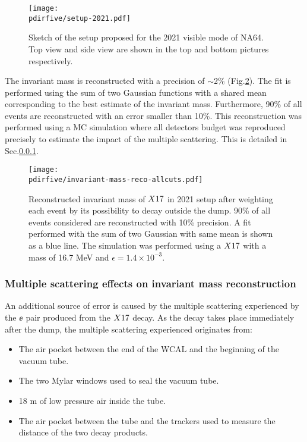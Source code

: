 \begin{figure}[tbh!]
  \centering
  \texttt{[image: \\pdirfive/setup-2021.pdf]}
  \caption[2021 setup]{Sketch of the setup proposed for the 2021 visible mode of NA64. Top view and side view are shown in the top and bottom pictures respectively.}
  \label{fig:setup-2021}
\end{figure}

The invariant mass is reconstructed with a precision of $\sim$2\% (Fig.\ref{fig:imassreco}). The fit is performed using the sum of two Gaussian functions with a shared mean corresponding to the best estimate of the invariant mass. Furthermore, 90\% of all events are reconstructed with an error smaller than 10\%. This reconstruction was performed using a MC simulation where all detectors budget was reproduced precisely to estimate the impact of the multiple scattering. This is detailed in Sec.\ref{ch5:sec:mm-scattering}.


\begin{figure}[tbh!]
  \centering
  \texttt{[image: \\pdirfive/invariant-mass-reco-allcuts.pdf]}
  \caption[Invariant mass reconstruction in 2021 setup]{Reconstructed invariant mass of $X17$ in 2021 setup after weighting each event by its possibility to decay outside the dump. 90\% of all events considered are reconstructed with 10\% precision. A fit performed with the sum of two Gaussian with same mean is shown as a blue line. The simulation was performed using a $X17$ with a mass of 16.7 MeV and $\epsilon = 1.4\times10^{-3}$.}
    \label{fig:imassreco}
  \end{figure}

\subsubsection{Multiple scattering effects on invariant mass reconstruction}
\label{ch5:sec:mm-scattering}

An additional source of error is caused by the multiple scattering experienced by the $\ee$ pair produced from the $X17$ decay. As the decay takes place immediately after the dump, the multiple scattering experienced originates from:

\begin{itemize}
\item The air pocket between the end of the WCAL and the beginning of the vacuum tube.
\item The two Mylar windows used to seal the vacuum tube.
\item 18 m of low pressure air inside the tube.
\item The air pocket between the tube and the trackers used to measure the distance of the two decay products.
\end{itemize}

